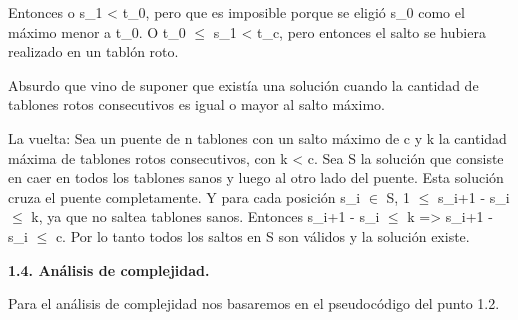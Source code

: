 Entonces o s_1 < t_0, pero que es imposible porque se eligió s_0 como el máximo
menor a t_0.
O t_0 $\leq$ s_1 < t_c, pero entonces el salto se hubiera realizado en un
tablón roto.

Absurdo que vino de suponer que existía una solución cuando la cantidad de
tablones rotos consecutivos es igual o mayor al salto máximo.

La vuelta:
Sea un puente de n tablones con un salto máximo de c y k la cantidad máxima de
tablones rotos consecutivos, con k < c.
Sea S la solución que consiste en caer en todos los tablones sanos y luego al
otro lado del puente.
Esta solución cruza el puente completamente.
Y para cada posición s_i $\in$ S, 1 $\leq$ s_{i+1} - s_i $\leq$ k, ya que no
saltea tablones sanos.
Entonces s_{i+1} - s_i $\leq$ k => s_{i+1} - s_i $\leq$ c. Por lo tanto todos
los saltos en S son válidos y la solución existe.

\vspace*{0.75cm} \noindent



\noindent
\textbf{1.4. Análisis de complejidad.}

\vspace*{0.3cm}

Para el análisis de complejidad nos basaremos en el pseudocódigo del punto 1.2.

